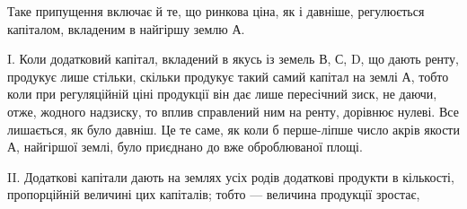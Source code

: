 Таке припущення включає й те, що ринкова ціна, як і давніше, регулюється
капіталом, вкладеним в найгіршу землю А.

I. Коли додатковий капітал, вкладений в якусь із земель В, С, D, що
дають ренту, продукує лише стільки, скільки продукує такий самий капітал на
землі А, тобто коли при регуляційній ціні продукції він дає лише пересічний
зиск, не даючи, отже, жодного надзиску, то вплив справлений ним на ренту, дорівнює
нулеві. Все лишається, як було давніш. Це те саме, як коли б перше-ліпше
число акрів якости А, найгіршої землі, було приєднано до вже оброблюваної
площі.

II. Додаткові капітали дають на землях усіх родів додаткові продукти в кількості,
пропорційній величині цих капіталів; тобто — величина продукції зростає,
